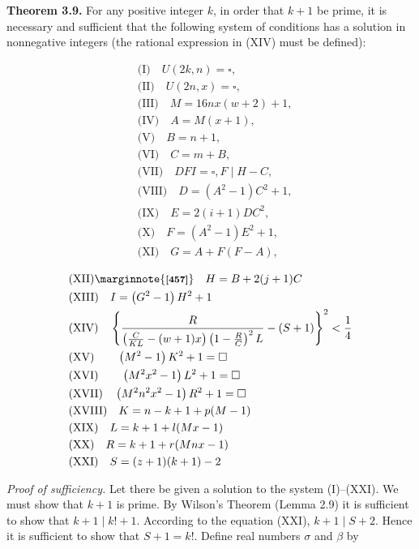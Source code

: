 \documentclass[10pt,letterpaper]{article}
\newcommand{\origpage}[1]{\marginnote{\footnotesize\textbf{[#1]}}}
\newcommand{\statement}[1]{\par\medskip\noindent\textbf{#1}\enspace}
\begin{document}
\statement{Theorem 3.9.} For any positive integer $k$, in order that $k+1$ be prime, it is necessary and sufficient that the following system of conditions has a solution in nonnegative integers (the rational expression in (XIV) must be defined):

\begin{align*}
&\text{(I)}\quad U(2 k, n)=\square,\\
&\text{(II)}\quad U(2 n, x)=\square,\\
&\text{(III)}\quad M=16 n x(w+2)+1,\\
&\text{(IV)}\quad A=M(x+1),\\
&\text{(V)}\quad B=n+1,\\
&\text{(VI)}\quad C=m+B,\\
&\text{(VII)}\quad D F I=\square, F \mid H-C,\\
&\text{(VIII)}\quad D=\left(A^{2}-1\right) C^{2}+1,\\
&\text{(IX)}\quad E=2(i+1) D C^{2},\\
&\text{(X)}\quad F=\left(A^{2}-1\right) E^{2}+1,\\
&\text{(XI)}\quad G=A+F(F-A),
\end{align*}

\begin{align*}
 &\text{(XII)}\origpage{457}\quad H=B+2(j+1) C\\
 &\text{(XIII)}\quad I=\left(G^{2}-1\right) H^{2}+1\\
 &\text{(XIV)}\quad \left\{\frac{R}{\left(\frac{C}{K L}-(w+1) x\right)\left(1-\frac{R}{C}\right)^{2} L}-(S+1)\right\}^{2}<\frac{1}{4}\\
 &\text{(XV)}\quad \quad\left(M^{2}-1\right) K^{2}+1=\square\\
 &\text{(XVI)}\quad \quad\left(M^{2} x^{2}-1\right) L^{2}+1=\square\\
 &\text{(XVII)}\quad \left(M^{2} n^{2} x^{2}-1\right) R^{2}+1=\square\\
 &\text{(XVIII)}\quad K=n-k+1+p(M-1)\\
 &\text{(XIX)}\quad L=k+1+l(M x-1)\\
 &\text{(XX)}\quad R=k+1+r(M n x-1)\\
 &\text{(XXI)}\quad S=(z+1)(k+1)-2
\end{align*}

\textit{Proof of sufficiency.} Let there be given a solution to the system (I)--(XXI). We must show that $k+1$ is prime. By Wilson's Theorem (Lemma 2.9) it is sufficient to show that $k+1 \mid k!+1$. According to the equation (XXI), $k+1 \mid S+2$. Hence it is sufficient to show that $S+1=k!$. Define real numbers $\sigma$ and $\beta$ by
\end{document}
